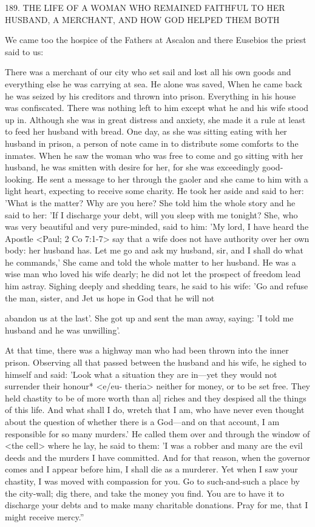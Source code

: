 189. THE LIFE OF A WOMAN WHO REMAINED
FAITHFUL TO HER HUSBAND, A MERCHANT,
AND HOW GOD HELPED THEM BOTH

We came too the hospice of the Fathers at Ascalon and there
Eusebios the priest said to us:

There was a merchant of our city who set sail and lost all his own
goods and everything else he was carrying at sea. He alone was
saved, When he came back he was seized by his creditors and
thrown into prison. Everything in his house was confiscated. There
was nothing left to him except what he and his wife stood up in.
Although she was in great distress and anxiety, she made it a rule
at least to feed her husband with bread. One day, as she was sitting
eating with her husband in prison, a person of note came in to
distribute some comforts to the inmates. When he saw the woman
who was free to come and go sitting with her husband, he was
smitten with desire for her, for she was exceedingly good-looking.
He sent a message to her through the gaoler and she came to him
with a light heart, expecting to receive some charity. He took her
aside and said to her: 'What is the matter? Why are you here? She
told him the whole story and he said to her: 'If I discharge your
debt, will you sleep with me tonight? She, who was very beautiful
and very pure-minded, said to him: 'My lord, I have heard the
Apostle <Paul; 2 Co 7:1-7> say that a wife does not have authority
over her own body: her husband has. Let me go and ask my
husband, sir, and I shall do what he commands,' She came and told
the whole matter to her husband. He was a wise man who loved his
wife dearly; he did not let the prospect of freedom lead him astray.
Sighing deeply and shedding tears, he said to his wife: 'Go and
refuse the man, sister, and Jet us hope in God that he will not

abandon us at the last'. She got up and sent the man away, saying:
'I told me husband and he was unwilling'.

At that time, there was a highway man who had been thrown
into the inner prison. Observing all that passed between the husband
and his wife, he sighed to himself and said: 'Look what a situation
they are in—yet they would not surrender their honour* <e/eu-
theria> neither for money, or to be set free. They held chastity to
be of more worth than al] riches and they despised all the things of
this life. And what shall I do, wretch that I am, who have never
even thought about the question of whether there is a God—and on
that account, I am responsible for so many murders.' He called
them over and through the window of <the cell> where he lay, he
said to them: 'I was a robber and many are the evil deeds and the
murders I have committed. And for that reason, when the governor
comes and I appear before him, I shall die as a murderer. Yet when
I saw your chastity, I was moved with compassion for you. Go to
such-and-such a place by the city-wall; dig there, and take the
money you find. You are to have it to discharge your debts and to
make many charitable donations. Pray for me, that I might receive
mercy.”

